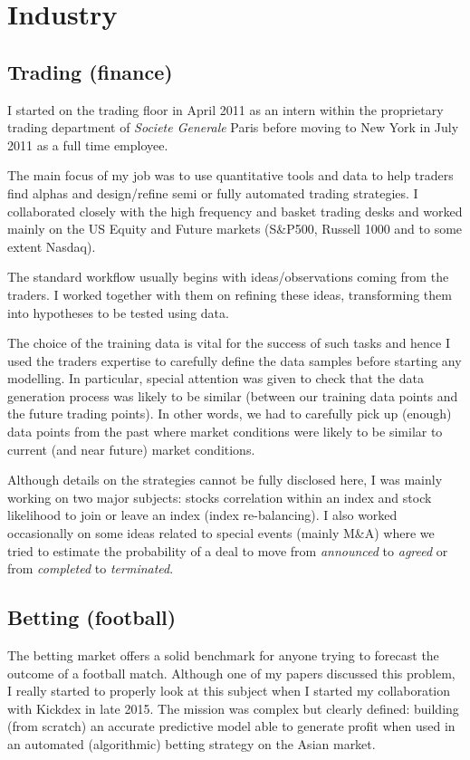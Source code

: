 \documentclass[11pt]{article}
\begin{document}
\section{Industry}
\label{sec:orgd889c70}
\subsection{Trading (finance)}
\label{sec:org54d4e88}
I started on the trading floor in April 2011 as an intern within the
proprietary trading department of \emph{Societe Generale} Paris before moving to New
York in July 2011 as a full time employee.

The main focus of my job was to use quantitative tools and data to help
traders find alphas and design/refine semi or fully automated trading
strategies. I collaborated closely with the high frequency and basket trading
desks and worked mainly on the US Equity and Future markets (S\&P500, Russell
1000 and to some extent Nasdaq).

The standard workflow usually begins with ideas/observations coming from the
traders. I worked together with them on refining these ideas, transforming
them into hypotheses to be tested using data. 

The choice of the training data is vital for the success of such tasks and
hence I used the traders expertise to carefully define the data samples
before starting any modelling. In particular, special attention was given to
check that the data generation process was likely to be similar (between our
training data points and the future trading points). In other words, we had to
carefully pick up (enough) data points from the past where market conditions
were likely to be similar to current (and near future) market conditions.

Although details on the strategies cannot be fully disclosed here, I was
mainly working on two major subjects: stocks correlation within an index and
stock likelihood to join or leave an index (index re-balancing). I also
worked occasionally on some ideas related to special events (mainly M\&A)
where we tried to estimate the probability of a deal to move from \emph{announced}
to \emph{agreed} or from \emph{completed} to \emph{terminated}.
\subsection{Betting (football)}
\label{sec:orgfebe299}
The betting market offers a solid benchmark for anyone trying to forecast the
outcome of a football match. Although one of my papers \cite{boshnakov2017bivariate}
discussed this problem, I really started to properly look at this subject
when I started my collaboration with Kickdex in late 2015. The mission was
complex but clearly defined: building (from scratch) an accurate predictive
model able to generate profit when used in an automated (algorithmic) betting
strategy on the Asian market.
\end{document}
